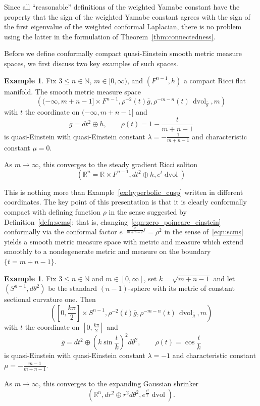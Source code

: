\documentclass{amsart}
\theoremstyle{definition}
\newtheorem{example}[thm]{Example}
\theoremstyle{remark}
\numberwithin{equation}{section}
\begin{document}
Since all ``reasonable'' definitions of the weighted Yamabe constant have the property that the sign of the weighted Yamabe constant agrees with the sign of the first eigenvalue of the weighted conformal Laplacian, there is no problem using the latter in the formulation of Theorem~\ref{thm:connectedness}.

Before we define conformally compact quasi-Einstein smooth metric measure spaces, we first discuss two key examples of such spaces.

\begin{example}
\label{ex:qe2_zero}
Fix $3\leq n\in{\mathbb{N}}$, $m\in[0,\infty)$, and $(F^{n-1},h)$ a compact Ricci flat manifold.  The smooth metric measure space
\begin{equation}
\label{eqn:zero_poincare_einstein}
\left( (-\infty,m+n-1] \times F^{n-1}, \rho^{-2}(t){\overline{g}}, \rho^{-m-n}(t)\,\operatorname{dvol}_{\overline{g}}, m \right)
\end{equation}
with $t$ the coordinate on $(-\infty,m+n-1]$ and
\[ {\overline{g}} = dt^2\oplus h, \qquad \rho(t) = 1-\frac{t}{m+n-1} \]
is quasi-Einstein with quasi-Einstein constant $\lambda=-\frac{1}{m+n-1}$ and characteristic constant $\mu=0$.

As $m\to\infty$, this converges to the steady gradient Ricci soliton
\[ \left( {\mathbb{R}}^n={\mathbb{R}}\times F^{n-1}, dt^2\oplus h, e^{t}\operatorname{dvol} \right) \]
\end{example}

This is nothing more than Example~\ref{ex:hyperbolic_cusp} written in different coordinates.  The key point of this presentation is that it is clearly conformally compact with defining function $\rho$ in the sense suggested by Definition~\ref{defn:scms}; that is, changing~\eqref{eqn:zero_poincare_einstein} conformally via the conformal factor $e^{-\frac{2}{m+n-2}f}=\rho^2$ in the sense of~\eqref{eqn:scms} yields a smooth metric measure space with metric and measure which extend smoothly to a nondegenerate metric and measure on the boundary $\{t=m+n-1\}$.

\begin{example}
\label{ex:qe2_negative}
Fix $3\leq n\in{\mathbb{N}}$ and $m\in[0,\infty]$, set $k=\sqrt{m+n-1}$ and let $(S^{n-1},d\theta^2)$ be the standard $(n-1)$-sphere with its metric of constant sectional curvature one.  Then
\begin{equation}
\label{eqn:negative_poincare_einstein}
\left( \left[0,\frac{k\pi}{2}\right]\times S^{n-1}, \rho^{-2}(t){\overline{g}}, \rho^{-m-n}(t)\,\operatorname{dvol}_{\overline{g}}, m \right)
\end{equation}
with $t$ the coordinate on $[0,\frac{k\pi}{2}]$ and
\[ {\overline{g}} = dt^2\oplus\left(k\sin\frac{t}{k}\right)^2d\theta^2, \qquad \rho(t) = \cos\frac{t}{k} \]
is quasi-Einstein with quasi-Einstein constant $\lambda=-1$ and characteristic constant $\mu=-\frac{m-1}{m+n-1}$.

As $m\to\infty$, this converges to the expanding Gaussian shrinker
\[ \left( {\mathbb{R}}^n, dr^2\oplus r^2d\theta^2, e^{\frac{r^2}{2}}\operatorname{dvol} \right) . \]
\end{example}
\end{document}
